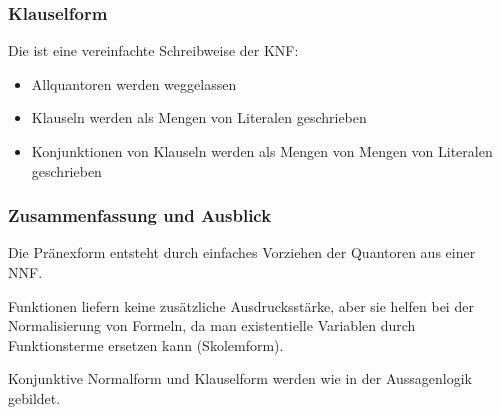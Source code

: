 \documentclass[aspectratio=1610,onlymath]{beamer}
\begin{document}
\begin{frame}\frametitle{Klauselform}

Die  ist eine vereinfachte Schreibweise der KNF:
\begin{itemize}
\item Allquantoren werden weggelassen
\item Klauseln werden als Mengen von Literalen geschrieben
\item Konjunktionen von Klauseln werden als Mengen von Mengen von Literalen geschrieben
\end{itemize}


\end{frame}






\begin{frame}\frametitle{Zusammenfassung und Ausblick}

Die Pränexform entsteht durch einfaches Vorziehen der Quantoren aus einer NNF.\bigskip

Funktionen liefern keine zusätzliche Ausdrucksstärke, aber sie helfen bei der
Normalisierung von Formeln, da man existentielle Variablen durch Funktionsterme ersetzen kann (Skolemform).
\bigskip

Konjunktive Normalform und Klauselform werden wie in der Aussagenlogik gebildet.
\bigskip


\end{frame}
\end{document}
